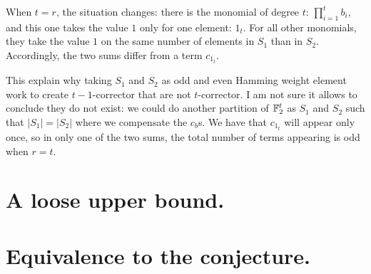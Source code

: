 \documentclass[11pt]{llncs}
\begin{document}
When $t=r$, the situation changes: there is the monomial of degree $t$: $\prod_{i=1}^t b_i$, and this one takes the value $1$ only for one element: $1_t$. For all other monomials, they take the value $1$ on the same number of elements in $S_1$ than in $S_2$.
Accordingly, the two sums differ from a term $c_{1_t}$.

This explain why taking $S_1$ and $S_2$ as odd and even Hamming weight element work to create $t-1$-corrector that are not $t$-corrector.
I am not sure it allows to conclude they do not exist: we could do another partition of $\mathbb{F}_2^t$ as $S_1$ and $S_2$ such that $|S_1|=|S_2|$ where we compensate the $c_b$s. We have that $c_{1_t}$ will appear only once, so in only one of the two sums, the total number of terms appearing is odd when $r=t$.

























\ifnum{}


\else


\fi

\appendix
{}
\section{A loose upper bound.}

\section{Equivalence to the conjecture.}

\end{document}
